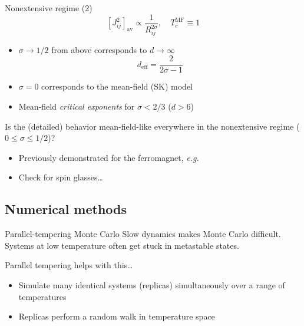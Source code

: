 \documentclass{beamer}
\newcommand{\sbr}[1]{\left[#1\right]}
\newcommand{\dav}[1]{\sbr{#1}_{\text{av}}}
\begin{document}
\begin{frame}{Nonextensive regime (2)}
  \begin{equation*}
    \dav{J_{ij}^2} \propto \frac{1}{R_{ij}^{2\sigma}},\quad
    T_c^{\text{MF}} \equiv 1
  \end{equation*}
  \begin{itemize}
    \item $\sigma \to 1/2$ from above corresponds to $d \to \infty$
      \begin{equation*}
        d_{\text{eff}} = \frac{2}{2\sigma - 1}
      \end{equation*}
    \item $\sigma=0$ corresponds to the mean-field (SK) model
    \item Mean-field \emph{critical exponents} for $\sigma<2/3$ ($d>6$)
  \end{itemize}
  \alert{Is the (detailed) behavior mean-field-like everywhere in the
    nonextensive regime ($0 \leq \sigma \leq 1/2$)?}
  \autocite{mori2011instability}
  \begin{itemize}
    \item Previously demonstrated for the ferromagnet, \textit{e.g.}
      \textcite{cannas2000evidence}
    \item Check for spin glasses\dots
  \end{itemize}
\end{frame}


\subsection{Numerical methods}

\begin{frame}{Parallel-tempering Monte Carlo}
  \alert{Slow dynamics} makes Monte Carlo difficult. Systems at low
  temperature often get stuck in metastable states.

  \alert{Parallel tempering} helps with this\dots
  \begin{itemize}
    \item Simulate many identical systems (replicas) simultaneously over a
      range of temperatures
    \item Replicas perform a random walk in temperature space
  \end{itemize}
  \begin{figure}
    
  \end{figure}
\end{frame}
\end{document}
